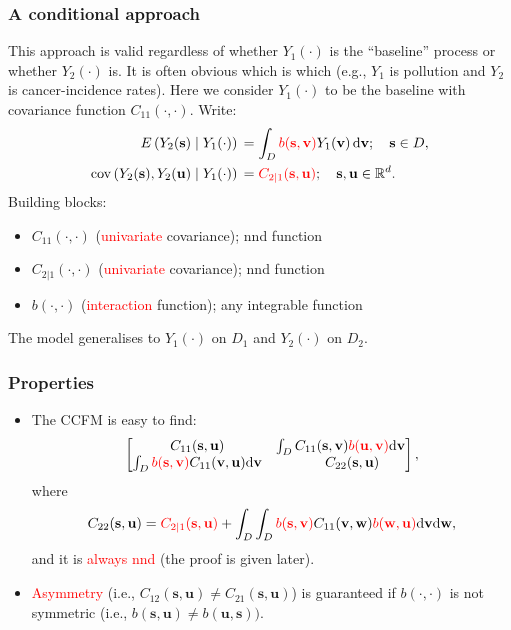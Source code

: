\documentclass{beamer}
\newcommand{\svec} {\textbf{s}}
\newcommand{\uvec} {\textbf{u}}
\newcommand{\s}{\mathbf{s}}
\renewcommand{\v}{\mathbf{v}}
\renewcommand{\u}{\mathbf{u}}
\newcommand{\w}{\mathbf{w}}
\renewcommand{\d}{\mathrm{d}}
\newcommand{\E}{E}
\newcommand{\cov}{\mathrm{cov}}
\newcommand{\red}{\textcolor{red}}%
\begin{document}

\begin{frame}
\frametitle{A conditional approach}
This approach is valid regardless of whether $Y_1(\cdot)$ is the ``baseline'' process or whether $Y_2(\cdot)$ is. It is often obvious which is which (e.g., $Y_1$ is pollution and $Y_2$ is cancer-incidence rates). Here we consider $Y_1(\cdot)$ to be the baseline with covariance function $C_{11}(\cdot,\cdot)$. Write:
\begin{align*}
\E\left(Y_2(\s)\mid Y_1(\cdot)\right)&\,=\int_D{\textcolor{red}{b(\s,\v)}Y_1(\v)\,\d \v};\quad \s\in D,\\
\cov\left(Y_2(\s),Y_2(\u)\mid Y_1(\cdot)\right)&\,=\textcolor{red}{C_{2\mid 1}(\s,\u)};\quad \s,\u\in \mathbb{R}^d.
\end{align*}
Building blocks:
\begin{itemize}
\item $C_{11}(\cdot,\cdot)$ (\textcolor{red}{univariate} covariance); nnd function
\item $C_{2|1}(\cdot,\cdot)$ (\textcolor{red}{univariate} covariance); nnd function
\item $b(\cdot,\cdot)$ (\textcolor{red}{interaction} function); any integrable function
\end{itemize}
The model generalises to $Y_1(\cdot)$ on $D_1$ and $Y_2(\cdot)$ on $D_2$.
\end{frame}


\begin{frame}
\frametitle{Properties}
\begin{itemize}
\item The CCFM is easy to find:
$$
\begin{bmatrix} C_{11}(\s,\u) & \int_DC_{11}(\s,\v)\textcolor{red}{b(\u,\v)}\d\v \\ \int_D\textcolor{red}{b(\s,\v)}C_{11}(\v,\u)\d\v & ~~~~~C_{22}(\s,\u)\end{bmatrix},
$$
where 
$$
C_{22}(\s,\u) = \textcolor{red}{C_{2\mid 1}(\s,\u)}+\int_D\int_D \red{b(\s,\v)}C_{11}(\v,\w) \red{b(\w,\u)}\d\v\d\w,
$$
and it is \textcolor{red}{always nnd} (the proof is given later). \vfill

\item \textcolor{red}{Asymmetry} (i.e., $C_{12}(\svec,\uvec) \ne C_{21}(\svec,\uvec)$) is guaranteed if $b(\cdot,\cdot)$ is not symmetric (i.e., $b(\s,\u)\neq b(\u,\s))$.\vfill
\end{itemize}
\end{frame}
\end{document}
